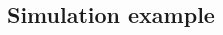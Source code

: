 \documentclass[10pt, a4paper]{article}
\newcommand{\m}[1]{\boldsymbol{#1}}
\newcommand{\fmm}{\textsc{fmm}\xspace}
\begin{document}
\begin{spacing}{1.9}
%
%
%
%
%


\subsection{Simulation example}


\end{spacing}
\end{document}
